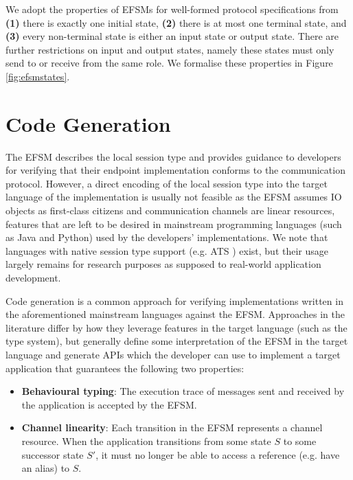 We adopt the properties of EFSMs for well-formed protocol specifications from \cite{Hybrid2016} \textbf{(1)} there is exactly one initial state, \textbf{(2)} there is at most one terminal state, and \textbf{(3)} every non-terminal state is either an input state or output state. There are further restrictions on input and output states, namely these states must only send to or receive from the same role. We formalise these properties in Figure \ref{fig:efsmstates}.








\section{Code Generation}
The EFSM describes the local session type and provides guidance to developers for verifying that their endpoint implementation conforms to the communication protocol. However, a direct encoding of the local session type into the target language of the implementation is usually not feasible as the EFSM assumes IO objects as first-class citizens and communication channels are linear resources, features that are left to be desired in mainstream programming languages (such as Java and Python) used by the developers' implementations. We note that languages with native session type support (e.g. ATS \cite{ATS2016}) exist, but their usage largely remains for research purposes as supposed to real-world application development.

Code generation is a common approach for verifying implementations written in the aforementioned mainstream languages against the EFSM. Approaches in the literature differ by how they leverage features in the target language (such as the type system), but generally define some interpretation of the EFSM in the target language and generate APIs which the developer can use to implement a target application that guarantees the following two properties:

\begin{itemize}
\item \textbf{Behavioural typing}: The execution trace of messages sent and received by the application is accepted by the EFSM.
\item \textbf{Channel linearity}: Each transition in the EFSM represents a channel resource. When the application transitions from some state $S$ to some successor state $S'$, it must no longer be able to access a reference (e.g. have an alias) to $S$.
\end{itemize}

